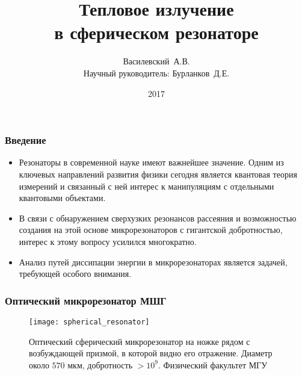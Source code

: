 \documentclass{beamer}
\title{Тепловое излучение\\ в сферическом резонаторе}
\author[Василевский~А.В.]{
    Василевский~А.В. \\[\baselineskip]
    {\footnotesize Научный руководитель: Бурланков~Д.Е.}
}
\institute[ННГУ]{Нижегородский университет им. Н.И.~Лобачевского}
\date{2017}
\begin{document}

    \frame{\titlepage}


    \begin{frame}\frametitle{Введение}

        \begin{itemize}

            \item Резонаторы в современной науке имеют важнейшее значение. Одним из ключевых направлений развития физики сегодня является квантовая теория измерений и связанный с ней интерес к манипуляциям с отдельными квантовыми объектами.

            \item В связи с обнаружением сверхузких резонансов рассеяния и возможностью создания на этой основе микрорезонаторов с гигантской добротностью, интерес к этому вопросу усилился многократно.

            \item Анализ путей диссипации энергии в микрорезонаторах является задачей, требующей особого внимания.

        \end{itemize}

    \end{frame}


    \begin{frame}\frametitle{Оптический микрорезонатор МШГ}

        \begin{figure}[h]
            \centering
            \texttt{[image: spherical\_resonator]}
            \caption[]{Оптический сферический микрорезонатор на ножке рядом с возбуждающей призмой, в которой видно его отражение. Диаметр около $570$ мкм, добротность $> 10^9$. Физический факультет МГУ \cite{microresonators}}
            \label{fig:spherical_resonator}
        \end{figure}

    \end{frame}
\end{document}
